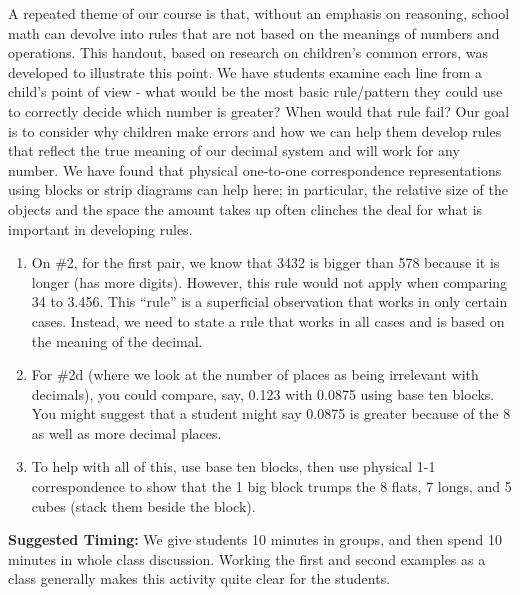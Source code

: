 \documentclass{ximera}
\begin{document}
\newpage
\begin{instructorNotes}
A repeated theme of our course is that, without an emphasis on reasoning, school math can devolve into rules that are not based on the meanings of numbers and operations.  This handout, based on research on children's common errors, was developed to illustrate this point.  We have students examine each line from a child's point of view - what would be the most basic rule/pattern they could use to correctly decide which number is greater? When would that rule fail? Our goal is to consider why children make errors and how we can help them develop rules that reflect the true meaning of our decimal system and will work for any number.  We have found that physical one-to-one correspondence representations using blocks or strip diagrams can help here; in particular, the relative size of the objects and the space the amount takes up often clinches the deal for what is important in developing rules.

\begin{enumerate}
 	\item On \#2, for the first pair, we know that 3432 is bigger than 578 because it is longer (has more digits).   However, this rule would not apply when comparing 34 to 3.456.  This ``rule'' is a superficial observation that works in only certain cases.  Instead, we need to state a rule that works in all cases and is based on the meaning of the decimal.
 	\item For \#2d (where we look at the number of places as being irrelevant with decimals), you could compare, say, 0.123 with 0.0875 using base ten blocks.  You might suggest that a student might say 0.0875 is greater because of the 8 as well as more decimal places.
 	\item To help with all of this, use base ten blocks, then use physical 1-1 correspondence to show that the 1 big block trumps the 8 flats, 7 longs, and 5 cubes (stack them beside the block).  
 \end{enumerate}

{\bf Suggested Timing:} We give students 10 minutes in groups, and then spend 10 minutes in whole class discussion.  Working the first and second examples as a class generally makes this activity quite clear for the students.
\end{instructorNotes}
\end{document}
